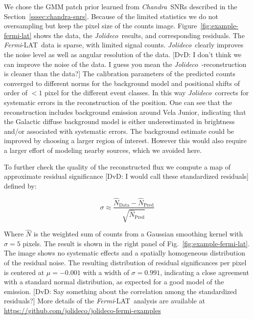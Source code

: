 \documentclass[twocolumn]{aastex631}
\newcommand{\chandra}{\textit{Chandra}~}
\newcommand{\fermi}{\textit{Fermi}-LAT~}
\newcommand{\jolideco}{\textit{Jolideco}~}
\newcommand{\dvd}[1]{{\color{red} [DvD: #1]}}
\begin{document}
    We chose the GMM patch prior learned from \chandra SNRs described in the Section~\ref{sssec:chandra-snrs}. Because of the limited statistics we do not oversampling but keep the pixel size of the counts image. 
    Figure~\ref{fig:example-fermi-lat} shows the data,  the \jolideco results, and corresponding residuals. The \fermi data is sparse, with %
    limited %
    signal counts. \jolideco clearly improves the noise level as well as angular resolution of the data. \dvd{I don't think we can improve the noise of the data. I guess you mean the \jolideco-reconstruction is cleaner than the data?} The calibration parameters of the predicted counts converged to different norms for the background model and positional shifts of order of $<1$ pixel for the different event classes. In this way \jolideco corrects for systematic errors in the reconstruction of the position. One can see that the reconstruction includes background emission around Vela Junior, indicating that the Galactic diffuse background model is either underestimated in brightness and/or associated with systematic errors. The background estimate could be improved by choosing a larger region of interest. However this would also require a larger effort of modeling nearby sources, which we avoided here.
    
    To further check the quality of the reconstructed flux we compute a map of approximate residual significance \dvd{I would call these standardized residuals} defined by:

    \begin{equation}
        \label{eq:approx-sigma}
        \sigma \approx \frac{\hat{N}_{\mathrm{Data}} - \hat{N}_{\mathrm{Pred}}} {\sqrt{\hat{N}_{\mathrm{Pred}}}}
    \end{equation}

    Where $\hat{N}$ is the weighted sum of counts from a Gaussian smoothing kernel with $\sigma=5$ pixels. The result is shown in the right panel of Fig.~\ref{fig:example-fermi-lat}. The image
    shows no systematic effects and a spatially homogeneous distribution of the residual noise. The resulting distribution of residual significances per pixel is centered at $\mu=-0.001$ with a width of $\sigma=0.991$, indicating a close agreement with a standard normal distribution, as expected for a good model of the emission. 
    \dvd{Say something about the correlation among the standardized residuals?}
    More details of the \fermi analysis are available at \url{https://github.com/jolideco/jolideco-fermi-examples}
    
\end{document}
